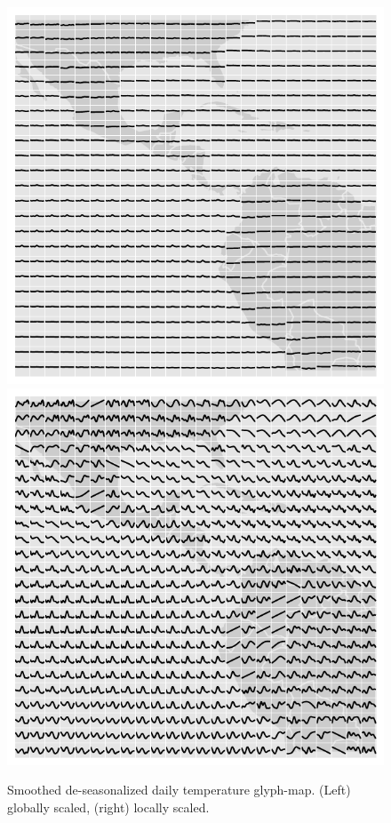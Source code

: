 \documentclass[oneside]{article}
\begin{document}
\begin{figure}[htbp]
  \centering
  \includegraphics[width=0.5\linewidth]{month-rescale-none}%
  \includegraphics[width=0.5\linewidth]{month-rescale01}
  \caption{Smoothed de-seasonalized daily temperature glyph-map. (Left)
globally scaled, (right) locally scaled.}
  \label{fig:scaling}
\end{figure}

% 
% 
% 
% 
\end{document}
